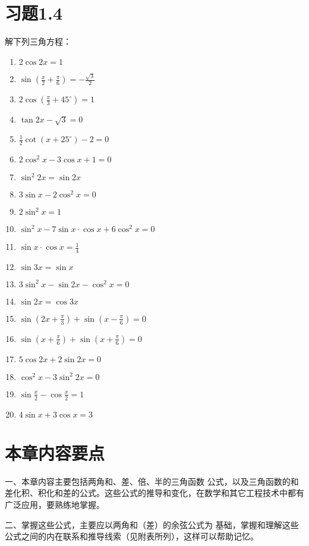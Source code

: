 \section*{习题1.4}
解下列三角方程：
\begin{multicols}{2}
    \begin{enumerate}
    \item $2\cos 2x=1$
    \item $\sin\left(\frac{x}{2}+\frac{\pi}{6}\right)=-\frac{\sqrt{3}}{2}$
    \item $2\cos\left(\frac{\pi}{3}+45^{\circ}\right)=1$
    \item $\tan2x-\sqrt{3}=0$
    \item $\frac{1}{2}\cot(x+25^{\circ})-2=0$
    \item $2\cos^2x-3\cos x+1=0$
    \item $\sin^2 2x=\sin 2x$
    \item $3\sin x-2\cos^2 x=0$
    \item $2\sin^2 x=1$
    \item $\sin^2 x-7\sin x\cdot \cos x+6\cos^2 x=0$
    \item $\sin x\cdot\cos x=\frac{1}{4}$
    \item $\sin 3x=\sin x$
    \item $3\sin^2 x-\sin 2x-\cos^2x=0$
    \item $\sin 2x=\cos 3x$
    \item $\sin\left(2x+\frac{\pi}{3}\right)+\sin\left(x-\frac{\pi}{6}\right)=0$
    \item $\sin\left(x+\frac{\pi}{6}\right)+\sin\left(x+\frac{\pi}{6}\right)=0$
    \item $5\cos2x+2\sin2x=0$
    \item $\cos^2x-3\sin^2 2x=0$
    \item $\sin\frac{x}{2}-\cos\frac{x}{2}=1$
    \item $4\sin x+3\cos x=3$
\end{enumerate}
\end{multicols}

\section*{本章内容要点}
一、本章内容主要包括两角和、差、倍、半的三角函数
公式，以及三角函数的和差化积、积化和差的公式。这些公式的推导和变化，在数学和其它工程技术中都有广泛应用，要熟练地掌握。

二、掌握这些公式，主要应以两角和（差）的余弦公式为
基础，掌握和理解这些公式之间的内在联系和推导线索（见附表所列），这样可以帮助记忆。

